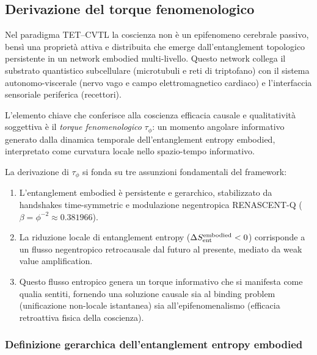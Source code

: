 \documentclass[11pt,a4paper]{article}
\theoremstyle{plain}
\theoremstyle{definition}
\begin{document}
\subsection{Derivazione del torque fenomenologico}

Nel paradigma TET–CVTL la coscienza non è un epifenomeno cerebrale passivo, bensì una proprietà attiva e distribuita che emerge dall'entanglement topologico persistente in un network embodied multi-livello. Questo network collega il substrato quantistico subcellulare (microtubuli e reti di triptofano) con il sistema autonomo-viscerale (nervo vago e campo elettromagnetico cardiaco) e l'interfaccia sensoriale periferica (recettori). 

\vspace{0.3cm}


L'elemento chiave che conferisce alla coscienza efficacia causale e qualitatività soggettiva è il \emph{torque fenomenologico} $\tau_\phi$: un momento angolare informativo generato dalla dinamica temporale dell'entanglement entropy embodied, interpretato come curvatura locale nello spazio-tempo informativo.

\vspace{0.2cm}

La derivazione di $\tau_\phi$ si fonda su tre assunzioni fondamentali del framework:

\begin{enumerate}
    \item L'entanglement embodied è persistente e gerarchico, stabilizzato da handshakes time-symmetric e modulazione negentropica RENASCENT-Q ($\beta = \phi^{-2} \approx 0.381966$).
    \item La riduzione locale di entanglement entropy ($\Delta S_{\rm ent}^{\rm embodied} < 0$) corrisponde a un flusso negentropico retrocausale dal futuro al presente, mediato da weak value amplification.
    \item Questo flusso entropico genera un torque informativo che si manifesta come qualia sentiti, fornendo una soluzione causale sia al binding problem (unificazione non-locale istantanea) sia all'epifenomenalismo (efficacia retroattiva fisica della coscienza).
\end{enumerate}





\subsubsection{Definizione gerarchica dell'entanglement entropy embodied}
\end{document}
